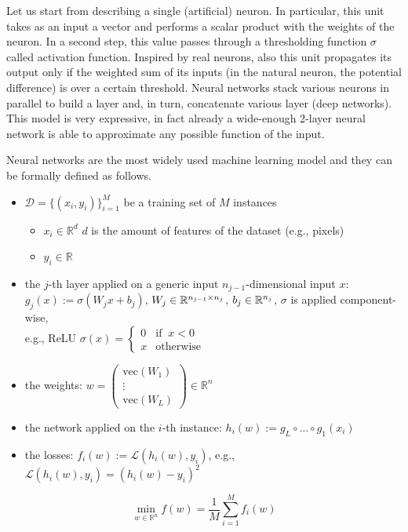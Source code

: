 \documentclass[10pt,a4paper]{article}
\begin{document}
\begin{example} Let us start from describing a single (artificial) neuron. In particular, this unit takes as an input a vector and performs a scalar product with the weights of the neuron. In a second step, this value passes through a thresholding function $\sigma$ called activation function. Inspired by real neurons, also this unit propagates its output only if the weighted sum of its inputs (in the natural neuron, the potential difference)  is over a certain threshold. Neural networks stack various neurons in parallel to build a layer and, in turn, concatenate various layer (deep networks). This model is very expressive, in fact already a wide-enough 2-layer neural network is able to approximate any possible function of the input.
	\par Neural networks are the most widely used machine learning model and they can be formally defined as follows. 
	\begin{itemize}
		\item $\mathcal{D}=\{(x_i, y_i)\}_{i=1}^{M}$ be a training set of $M$ instances
		\begin{itemize}
			\item $x_i \in \mathbb{R}^{d}$ $d$ is the amount of features of the dataset (e.g., pixels)
			\item $y_i\in\mathbb{R}$
		\end{itemize}
		\item the $j$-th layer applied on a generic input $n_{j-1}$-dimensional input $x$:\\
		$g_j(x) := \sigma (W_j x +b_j )$, $W_j \in \mathbb{R}^{n_{j-1}\times n_j}$, $b_j \in \mathbb{R}^{n_j}$, $\sigma$ is applied component-wise,\\ e.g., ReLU $\sigma(x)= \begin{cases} 0 & \text{if} \;\;x<0\\ x &\text{otherwise} \end{cases}$ %
		\item the weights: $w = \begin{pmatrix}
			\text{vec}(W_1)\\
			\vdots\\
			\text{vec}(W_L)
		\end{pmatrix}\in \mathbb{R}^{n}$
		\item the network applied on the $i$-th instance: $h_i(w):=g_L \circ \dots \circ g_1(x_i)$ 
		\item the losses: $f_i(w):=\mathcal{L}(h_i(w),y_i)$, e.g., $\mathcal{L}(h_i(w),y_i)= (h_i(w)-y_i)^2$%
	\end{itemize}
	
	\begin{equation} \label{eq:problem}
		\min_{w\in \mathbb{R}^n} f(w) = \frac{1}{M}\sum_{i=1}^{M} f_i(w)
	\end{equation}
\end{example}
\end{document}
